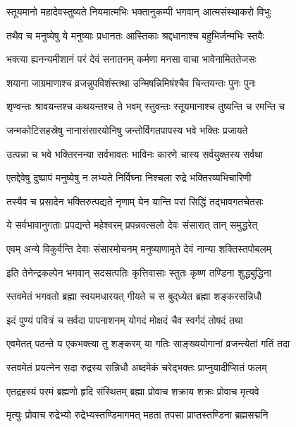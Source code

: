 \twolineshloka
{स्तूयमानो महादेवस्तुष्यते नियमात्मभिः}%
{भक्तानुकम्पी भगवान् आत्मसंस्थाकरो विभुः}


\twolineshloka
{तथैव च मनुष्येषु ये मनुष्याः प्रधानतः}%
{आस्तिकाः श्रद्दधानाश्च बहुभिर्जन्मभिः स्तवैः}


\twolineshloka
{भक्त्या ह्यनन्यमीशानं परं देवं सनातनम्}%
{कर्मणा मनसा वाचा भावेनामिततेजसः}


\twolineshloka
{शयाना जाग्रमाणाश्च व्रजन्नुपविशंस्तथा}%
{उन्मिषन्निमिषंश्चैव चिन्तयन्तः पुनः पुनः}

\twolineshloka
{शृण्वन्तः श्रावयन्तश्च कथयन्तश्च ते भवम्}%
{स्तुवन्तः स्तूयमानाश्च तुष्यन्ति च रमन्ति च}


\twolineshloka
{जन्मकोटिसहस्रेषु नानासंसारयोनिषु}%
{जन्तोर्विगतपापस्य भवे भक्तिः प्रजायते}


\twolineshloka
{उत्पन्ना च भवे भक्तिरनन्या सर्वभावतः}%
{भाविनः कारणे चास्य सर्वयुक्तस्य सर्वथा}


\twolineshloka
{एतद्देवेषु दुष्प्रापं मनुष्येषु न लभ्यते}%
{निर्विघ्ना निश्चला रुद्रे भक्तिरव्यभिचारिणी}

\twolineshloka
{तस्यैव च प्रसादेन भक्तिरुत्पद्यते नृणाम्}
{येन यान्ति परां सिद्धिं तद्भावगतचेतसः}%

\twolineshloka
{ये सर्वभावानुगताः प्रपद्यन्ते महेश्वरम्}
{प्रपन्नवत्सलो देवः संसारात् तान् समुद्धरेत्}%

\twolineshloka
{एवम् अन्ये विकुर्वन्ति देवाः संसारमोचनम्}
{मनुष्याणामृते देवं नान्या शक्तिस्तपोबलम्}%

\twolineshloka
{इति तेनेन्द्रकल्पेन भगवान् सदसत्पतिः}
{कृत्तिवासाः स्तुतः कृष्ण तण्डिना शुद्धबुद्धिना}%

\twolineshloka
{स्तवमेतं  भगवतो ब्रह्मा स्वयमधारयत्}
{गीयते च स बुद्‌ध्येत ब्रह्मा शङ्करसन्निधौ}%

\twolineshloka
{इदं पुण्यं पवित्रं च सर्वदा पापनाशनम्}
{योगदं मोक्षदं चैव स्वर्गदं तोषदं तथा}%

\twolineshloka
{एवमेतत् पठन्ते य एकभक्त्या तु शङ्करम्}
{या गतिः साङ्ख्ययोगानां व्रजन्त्येतां गतिं तदा}%

\twolineshloka
{स्तवमेतं प्रयत्नेन सदा रुद्रस्य सन्निधौ}
{अब्दमेकं चरेद्भक्तः प्राप्नुयादीप्सितं फलम्}%

\twolineshloka
{एतद्रहस्यं परमं ब्रह्मणो हृदि संस्थितम्}
{ब्रह्मा प्रोवाच शक्राय शक्रः प्रोवाच मृत्यवे}%

\twolineshloka
{मृत्युः प्रोवाच रुद्रेभ्यो रुद्रेभ्यस्तण्डिमागमत्}
{महता तपसा प्राप्तस्तण्डिना ब्रह्मसद्मनि}%

